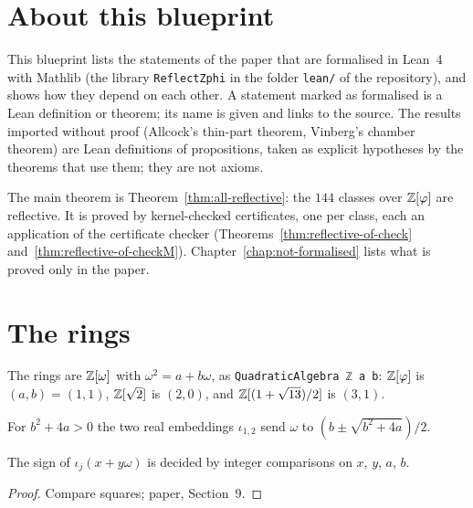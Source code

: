 
\chapter*{About this blueprint}

This blueprint lists the statements of the paper that are formalised in Lean~4 with Mathlib
(the library \texttt{ReflectZphi} in the folder \texttt{lean/} of the repository), and shows
how they depend on each other. A statement marked as formalised is a Lean definition or
theorem; its name is given and links to the source. The results imported without proof
(Allcock's thin-part theorem, Vinberg's chamber theorem) are Lean definitions of
propositions, taken as explicit hypotheses by the theorems that use them; they are not axioms.

The main theorem is Theorem~\ref{thm:all-reflective}: the $144$ classes over $\mathbb{Z}[\varphi]$
are reflective. It is proved by kernel-checked certificates, one per class, each an
application of the certificate checker (Theorems~\ref{thm:reflective-of-check}
and~\ref{thm:reflective-of-checkM}). Chapter~\ref{chap:not-formalised} lists what is proved
only in the paper.

\chapter{The rings}\label{chap:rings}

The rings are $\mathbb{Z}[\omega]$ with $\omega^2=a+b\omega$, as \texttt{QuadraticAlgebra ℤ a b}:
$\mathbb{Z}[\varphi]$ is $(a,b)=(1,1)$, $\mathbb{Z}[\sqrt2]$ is $(2,0)$, and $\mathbb{Z}[(1+\sqrt{13})/2]$ is $(3,1)$.

\begin{definition}\label{def:emb}
\leanok
For $b^2+4a>0$ the two real embeddings $\iota_{1,2}$ send $\omega$ to $(b\pm\sqrt{b^2+4a})/2$.
\end{definition}

\begin{lemma}\label{lem:sign}
\leanok
{}
The sign of $\iota_j(x+y\omega)$ is decided by integer comparisons on $x$, $y$, $a$, $b$.
\end{lemma}
\begin{proof}\leanok
Compare squares; paper, Section~9.
\end{proof}

